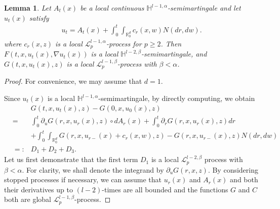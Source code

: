 \documentclass[12pt,oneside, reqno]{amsart}
\newcommand{\ce}{\begin{eqnarray*}}
\newcommand{\de}{\end{eqnarray*}}
\newtheorem{lemma}[theorem]{Lemma}
\def\mH{{\mathbb H}}
\def\mR{{\mathbb R}}
\def\sL{{\mathscr L}}
\def\geq{\geqslant}
\numberwithin{equation}{section}
\begin{document}
\begin{lemma}
		Let  $A_t(x)$ be a local continuous $\mH^{l-1,\alpha}$-semimartingale and let  $u_t(x)$  satisfy
	\ce 
	u_t=A_t(x)+\int_0^t\int_{\mR^d_0}c_r(x,w)N(dr,dw).
	\de 
where	$c_r(x,z)$ is a local $\sL_{p}^{l-1,\alpha}$-process for  $p\geq 2$.  Then   $F(t,x,u_t(x), \nabla u_t(x))$ is a local $\mH^{l-2,\beta}$-semimartingale, and  $G(t,x,u_t(x),z)$ is a local $\sL_p^{l-1,\beta}$-process  with $\beta<\alpha$. 
\end{lemma}
\begin{proof}
For convenience, we may assume that  $d=1$. 
	
	Since $u_t(x)$ is a local  $\mH^{l-1,\alpha}$-semimartingale, by directly computing, we obtain
	\ce 
	&&G(t,x,u_t(x),z)-G(0,x,u_0(x),z)\\
	&=&\int_0^t \partial_uG(r,x,u_r(x),z)\circ dA_r(x)+\int_0^t\partial_r G(r,x,u_r(x),z)dr\\
	&&+\int_0^t\int_{\mR^d_0}
	G(r,x,u_{r-}(x)+c_r(x,w),z)-G(r,x,u_{r-}(x),z)N(dr,dw)\\
	&=:&D_1+D_2+D_3.
	\de 
	Let us first demonstrate that the first term  $D_1$ is a local $\sL_p^{l-2,\beta}$ process with $\beta<\alpha$. For clarity, we shall denote the integrand by $\partial_u G(r,x,z)$. By considering stopped processes if necessary, we can assume that $u_r(x)$ and  $A_r(x)$ and both their derivatives up to $(l-2)$-times are all bounded and the functions  $G$ and $C$ both are  global $\sL_p^{l-1,\beta}$-process.
	

\end{proof}
\end{document}

